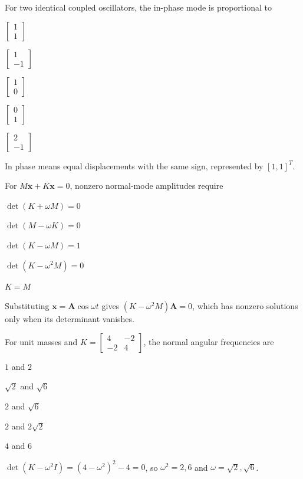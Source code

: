 \documentclass[10pt,a4paper,full]{physicsquiz}
\newcommand{\bankq}[9]{%
  \begin{quizquestion}[
    id=#1,
    topic={#2},
    difficulty=#3,
    marks=1,
    correct=#4,
    tags={#5},
    outcome={#6}
  ]
    #7
    \begin{choiceoptions}
      #8
    \end{choiceoptions}
  \end{quizquestion}
  \begin{quizsolution}
    #9
  \end{quizsolution}
}
\begin{document}
\begin{quizbank}
\bankq{modes-037}{Normal Modes}{foundation}{A}{normal-modes,in-phase}{Identify the in-phase eigenvector.}{%
For two identical coupled oscillators, the in-phase mode is proportional to}{%
\item \(\begin{bmatrix}1\\1\end{bmatrix}\)
\item \(\begin{bmatrix}1\\-1\end{bmatrix}\)
\item \(\begin{bmatrix}1\\0\end{bmatrix}\)
\item \(\begin{bmatrix}0\\1\end{bmatrix}\)
\item \(\begin{bmatrix}2\\-1\end{bmatrix}\)}{%
In phase means equal displacements with the same sign, represented by \([1,1]^T\).}

\bankq{modes-038}{Normal Modes}{foundation}{D}{normal-modes,eigenvalue}{Recall the normal-frequency condition.}{%
For \(M\ddot{\mathbf x}+K\mathbf x=0\), nonzero normal-mode amplitudes require}{%
\item \(\det(K+\omega M)=0\)
\item \(\det(M-\omega K)=0\)
\item \(\det(K-\omega M)=1\)
\item \(\det(K-\omega^2M)=0\)
\item \(K=M\)}{%
Substituting \(\mathbf x=\mathbf A\cos\omega t\) gives \((K-\omega^2M)\mathbf A=0\), which has nonzero solutions only when its determinant vanishes.}

\bankq{modes-039}{Normal Modes}{applied}{B}{normal-modes,matrix}{Find eigenfrequencies of a two-mode system.}{%
For unit masses and \(K=\begin{bmatrix}4&-2\\-2&4\end{bmatrix}\), the normal angular frequencies are}{%
\item \(1\) and \(2\)
\item \(\sqrt2\) and \(\sqrt6\)
\item \(2\) and \(\sqrt6\)
\item \(2\) and \(2\sqrt2\)
\item \(4\) and \(6\)}{%
\(\det(K-\omega^2I)=(4-\omega^2)^2-4=0\), so \(\omega^2=2,6\) and \(\omega=\sqrt2,\sqrt6\).}


\end{quizbank}
\end{document}
